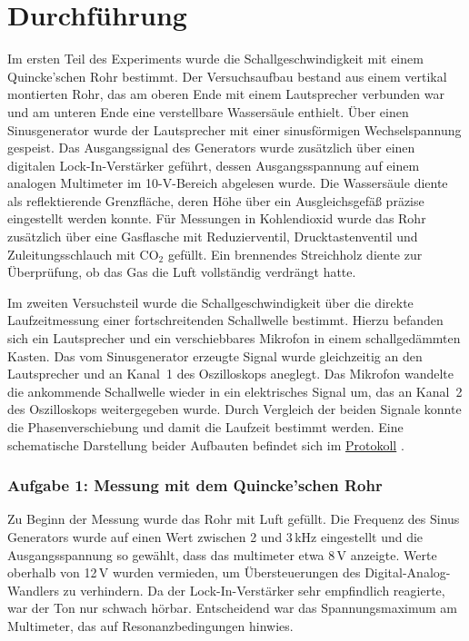 \chapter{Durchführung}

Im ersten Teil des Experiments wurde die Schallgeschwindigkeit mit einem Quincke'schen Rohr bestimmt. Der Versuchsaufbau bestand aus einem vertikal montierten Rohr, das am oberen Ende mit einem Lautsprecher verbunden war und am unteren Ende eine verstellbare Wassersäule enthielt. Über einen Sinusgenerator wurde der Lautsprecher mit einer sinusförmigen Wechselspannung gespeist. Das Ausgangssignal des Generators wurde zusätzlich über einen digitalen Lock-In-Verstärker geführt, dessen Ausgangsspannung auf einem analogen Multimeter im 10-V-Bereich abgelesen wurde. Die Wassersäule diente als reflektierende Grenzfläche, deren Höhe über ein Ausgleichsgefäß präzise eingestellt werden konnte. Für Messungen in Kohlendioxid wurde das Rohr zusätzlich über eine Gasflasche mit Reduzierventil, Drucktastenventil und Zuleitungsschlauch mit CO$_2$ gefüllt. Ein brennendes Streichholz diente zur Überprüfung, ob das Gas die Luft vollständig verdrängt hatte.

Im zweiten Versuchsteil wurde die Schallgeschwindigkeit über die direkte Laufzeitmessung einer fortschreitenden Schallwelle bestimmt. Hierzu befanden sich ein Lautsprecher und ein verschiebbares Mikrofon in einem schallgedämmten Kasten. Das vom Sinusgenerator erzeugte Signal wurde gleichzeitig an den Lautsprecher und an Kanal~1 des Oszilloskops aneglegt. Das Mikrofon wandelte die ankommende Schallwelle wieder in ein elektrisches Signal um, das an Kanal~2 des Oszilloskops weitergegeben wurde. Durch Vergleich der beiden Signale konnte die Phasenverschiebung und damit die Laufzeit bestimmt werden. Eine schematische Darstellung beider Aufbauten befindet sich im \hyperref[Protokoll]{Protokoll} .

\subsection*{Aufgabe 1: Messung mit dem Quincke'schen Rohr}

Zu Beginn der Messung wurde das Rohr mit Luft gefüllt. Die Frequenz des Sinus Generators wurde auf einen Wert zwischen 2 und 3\,kHz eingestellt und die Ausgangsspannung so gewählt, dass das multimeter etwa 8\,V anzeigte. Werte oberhalb von 12\,V wurden vermieden, um Übersteuerungen des Digital-Analog-Wandlers zu verhindern. Da der Lock-In-Verstärker sehr empfindlich reagierte, war der Ton nur schwach hörbar. Entscheidend war das Spannungsmaximum am Multimeter, das auf Resonanzbedingungen hinwies.

